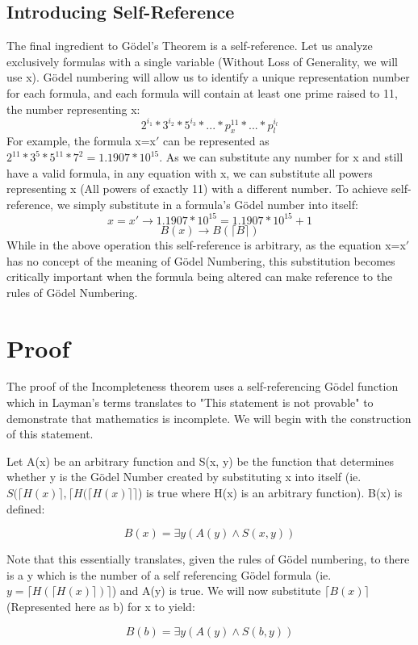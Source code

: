 \documentclass[conference]{IEEEtran}
\begin{document}
\subsection{Introducing Self-Reference}
The final ingredient to Gödel's Theorem is a self-reference. Let us analyze exclusively formulas with a single variable (Without Loss of Generality, we will use x). Gödel numbering will allow us to identify a unique representation number for each formula, and each formula will contain at least one prime raised to 11, the number representing x:
\[2^{i_1}*3^{i_2}*5^{i_3}*...*p_x^{11}*...*p_l^{i_l}\]
For example, the formula x=x$'$ can be represented as $2^{11}*3^5*5^{11}*7^2 = 1.1907*10^{15}$. As we can substitute any number for x and still have a valid formula, in any equation with x, we can substitute all powers representing x (All powers of exactly 11) with a different number. To achieve self-reference, we simply substitute in a formula's Gödel number into itself:
\[x=x' \rightarrow 1.1907*10^{15} = 1.1907*10^{15}+1\]
\[B(x) \rightarrow B(\lceil B \rceil )\]
While in the above operation this self-reference is arbitrary, as the equation x=x$'$ has no concept of the meaning of Gödel Numbering, this substitution becomes critically important when the formula being altered can make reference to the rules of Gödel Numbering. 

\section{Proof}
The proof of the Incompleteness theorem uses a self-referencing Gödel function which in Layman's terms translates to "This statement is not provable" to demonstrate that mathematics is incomplete. We will begin with the construction of this statement.

Let A(x) be an arbitrary function and S(x, y) be the function that determines whether y is the Gödel Number created by substituting x into itself (ie. $S(\lceil H(x) \rceil, \lceil H(\lceil H(x) \rceil \rceil$) is true where H(x) is an arbitrary function). B(x) is defined:

\[B(x) = \exists y(A(y) \land S(x,y))\]

Note that this essentially translates, given the rules of Gödel numbering, to there is a y which is the number of a self referencing Gödel formula (ie. $y = \lceil H(\lceil H(x) \rceil) \rceil$) and A(y) is true. We will now substitute $\lceil B(x) \rceil$ (Represented here as b) for x to yield:

\[B(b) = \exists y(A(y) \land S(b,y))\]
\end{document}
